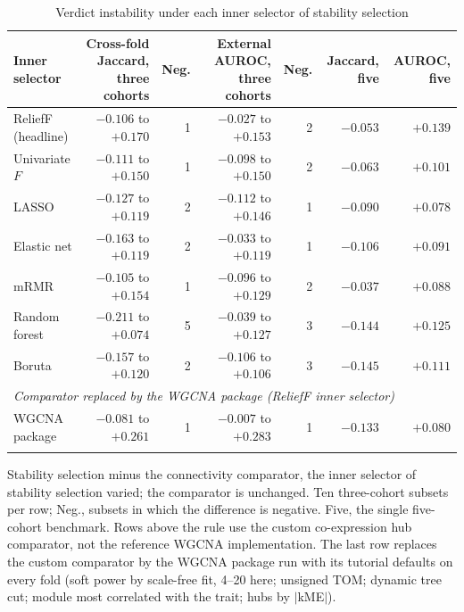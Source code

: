 \documentclass[unnumsec,webpdf,contemporary,large,numbered]{oup-authoring-template}
\begin{document}
\begin{table}[!t]
\caption{Verdict instability under each inner selector of stability selection}\label{tab:selectors}
\tabcolsep=0pt
\begin{tabular*}{\textwidth}{@{\extracolsep\fill}lrrrrrr@{\extracolsep\fill}}
\toprule
Inner selector & Cross-fold Jaccard, three cohorts & Neg. & External AUROC, three cohorts & Neg. & Jaccard, five & AUROC, five \\
\midrule
ReliefF (headline) & $-0.106$ to $+0.170$ & 1 & $-0.027$ to $+0.153$ & 2 & $-0.053$ & $+0.139$ \\
Univariate $F$     & $-0.111$ to $+0.150$ & 1 & $-0.098$ to $+0.150$ & 2 & $-0.063$ & $+0.101$ \\
LASSO              & $-0.127$ to $+0.119$ & 2 & $-0.112$ to $+0.146$ & 1 & $-0.090$ & $+0.078$ \\
Elastic net        & $-0.163$ to $+0.119$ & 2 & $-0.033$ to $+0.119$ & 1 & $-0.106$ & $+0.091$ \\
mRMR               & $-0.105$ to $+0.154$ & 1 & $-0.096$ to $+0.129$ & 2 & $-0.037$ & $+0.088$ \\
Random forest      & $-0.211$ to $+0.074$ & 5 & $-0.039$ to $+0.127$ & 3 & $-0.144$ & $+0.125$ \\
Boruta             & $-0.157$ to $+0.120$ & 2 & $-0.106$ to $+0.106$ & 3 & $-0.145$ & $+0.111$ \\
\midrule
\multicolumn{7}{l}{\textit{Comparator replaced by the WGCNA package (ReliefF inner selector)}} \\
WGCNA package      & $-0.081$ to $+0.261$ & 1 & $-0.007$ to $+0.283$ & 1 & $-0.133$ & $+0.080$ \\
\botrule
\end{tabular*}
\begin{tablenotes}%
\item Stability selection minus the connectivity comparator, the inner selector of stability selection varied; the comparator is unchanged. Ten three-cohort subsets per row; Neg., subsets in which the difference is negative. Five, the single five-cohort benchmark. Rows above the rule use the custom co-expression hub comparator, not the reference WGCNA implementation. The last row replaces the custom comparator by the WGCNA package run with its tutorial defaults on every fold (soft power by scale-free fit, 4--20 here; unsigned TOM; dynamic tree cut; module most correlated with the trait; hubs by $|$kME$|$).
\end{tablenotes}
\end{table}
\end{document}
